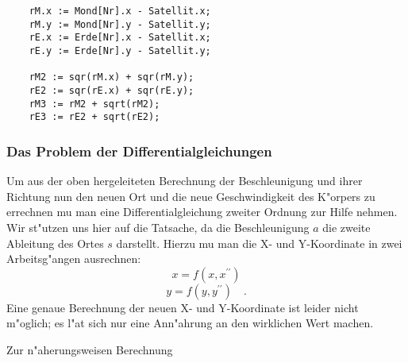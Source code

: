  \begin{verbatim}
	rM.x := Mond[Nr].x - Satellit.x; 
	rM.y := Mond[Nr].y - Satellit.y; 
	rE.x := Erde[Nr].x - Satellit.x; 
	rE.y := Erde[Nr].y - Satellit.y;

	rM2 := sqr(rM.x) + sqr(rM.y);
	rE2 := sqr(rE.x) + sqr(rE.y);
	rM3 := rM2 + sqrt(rM2);
	rE3 := rE2 + sqrt(rE2);
 \end{verbatim}

\subsubsection{Das Problem der Differentialgleichungen}
Um aus der oben hergeleiteten Berechnung der Beschleunigung und ihrer Richtung nun
den neuen Ort und die neue Geschwindigkeit des K"orpers zu errechnen mu\3 man eine
Differentialgleichung zweiter Ordnung zur Hilfe nehmen. Wir st"utzen uns hier auf die
Tatsache, da\3 die Beschleunigung $a$ die zweite Ableitung des Ortes $s$ darstellt.
Hierzu mu\3 man die X- und Y-Koordinate in zwei Arbeitsg"angen ausrechnen:
$$ x=f(x,x^{\prime\prime})$$
$$ y=f(y,y^{\prime\prime})\quad.$$
Eine genaue Berechnung der neuen X- und Y-Koordinate ist leider nicht m"oglich; es
l"a\3t sich nur eine Ann"ahrung an den wirklichen Wert machen.

Zur n"aherungsweisen Berechnung 